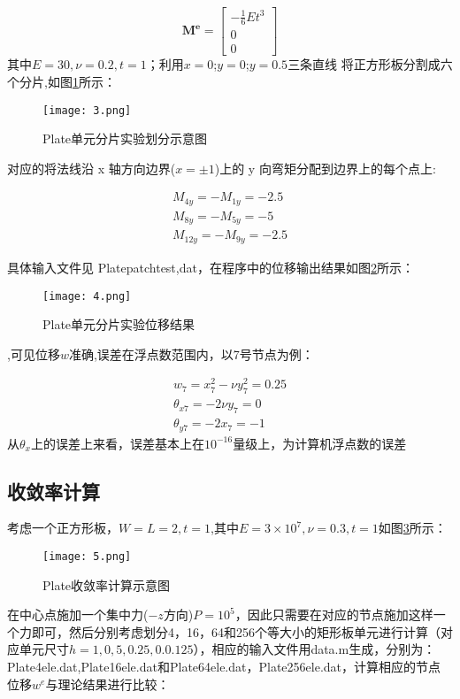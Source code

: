 \documentclass[forprint]{WHUBachelor}
\begin{document}
\begin{equation}
\bm{M^{e}=}\begin{bmatrix}-\frac{1}{6}Et^{3}\\
0\\
0
\end{bmatrix}\label{eq17}
\end{equation}
其中$E=30,\nu=0.2,t=1$；利用$x=0$;$y=0$;$y=0.5$三条直线 将正方形板分割成六个分片,如图\ref{f3}所示：

\begin{figure}[H]
\centering  
\texttt{[image: 3.png]} 
\caption{Plate单元分片实验划分示意图} 
\label{f3} 
\end{figure}

对应的将法线沿 x 轴方向边界($x=\pm1$)上的 y 向弯矩分配到边界上的每个点上:

\begin{equation}
\begin{array}{c}
M_{4y}=-M_{1y}=-2.5\\
M_{8y}=-M_{5y}=-5\\
M_{12y}=-M_{9y}=-2.5
\end{array}\label{eq18}
\end{equation}

具体输入文件见 Platepatchtest,dat，在程序中的位移输出结果如图\ref{f4}所示：

\begin{figure}[H]
\centering  
\texttt{[image: 4.png]} 
\caption{Plate单元分片实验位移结果} 
\label{f4} 
\end{figure},可见位移$w$准确,误差在浮点数范围内，以7号节点为例：

\begin{equation}
\begin{array}{c}
w_{7}=x_{7}^{2}-\nu y_{7}^{2}=0.25\\
\theta_{x7}=-2\nu y_{7}=0\\
\theta_{y7}=-2x_{7}=-1
\end{array}\label{eq19}
\end{equation}
从$\theta_{x}$上的误差上来看，误差基本上在$10^{-16}$量级上，为计算机浮点数的误差

\subsection{收敛率计算}

考虑一个正方形板，$W=L=2,t=1$,其中$E=3\times10^{7},\nu=0.3,t=1$如图\ref{f5}所示：

\begin{figure}[H]
\centering  
\texttt{[image: 5.png]} 
\caption{Plate收敛率计算示意图} 
\label{f5} 
\end{figure}在中心点施加一个集中力($-z$方向)$P=10^{5}$，因此只需要在对应的节点施加这样一个力即可，然后分别考虑划分4，16，64和256个等大小的矩形板单元进行计算（对应单元尺寸$h=1,0,5,0.25,0.0.125$），相应的输入文件用data.m生成，分别为：Plate4ele.dat,Plate16ele.dat和Plate64ele.dat，Plate256ele.dat，计算相应的节点位移$w^{e}$与理论结果进行比较：
\end{document}
